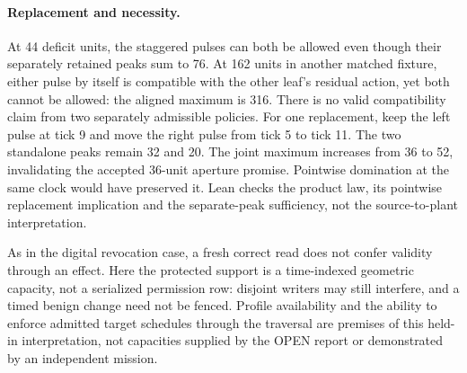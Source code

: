 \documentclass{article}
\begin{document}
\paragraph{Replacement and necessity.}
At 44 deficit units, the staggered pulses can both be allowed even
though their separately retained peaks sum to 76. At 162 units
in another matched fixture, either pulse by itself is compatible
with the other leaf's residual action, yet both cannot be allowed:
the aligned maximum is 316. There is no valid compatibility claim
from two separately admissible policies.
For one replacement, keep the left pulse at tick 9 and move the
right pulse from tick 5 to tick 11. The two standalone peaks remain
32 and 20. The joint maximum increases from 36 to 52, invalidating
the accepted 36-unit aperture promise. Pointwise domination at
the same clock would have preserved it. Lean checks the product
law, its pointwise replacement implication and the separate-peak
sufficiency, not the source-to-plant interpretation.

As in the digital revocation case, a fresh correct read does not
confer validity through an effect. Here the protected support is a
time-indexed geometric capacity, not a serialized permission row:
disjoint writers may still interfere, and a timed benign change
need not be fenced. Profile availability and the ability to enforce
admitted target schedules through the traversal are premises of
this held-in interpretation, not capacities supplied by the OPEN
report or demonstrated by an independent mission.
\end{document}
